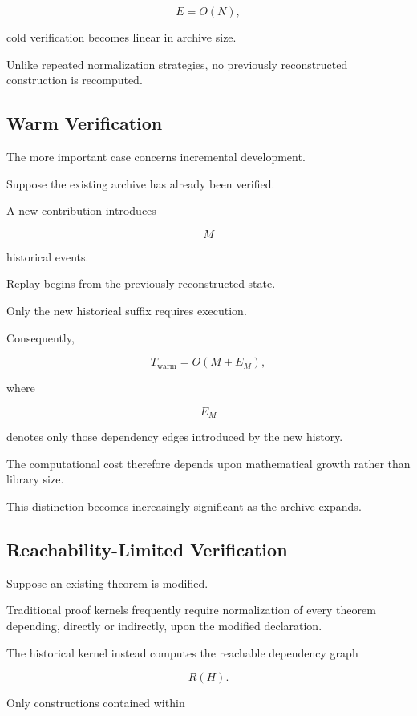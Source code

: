 \documentclass[12pt,oneside]{article}
\theoremstyle{definition}
\theoremstyle{remark}
\begin{document}
\[
E
=
O(N),
\]

cold verification becomes linear in archive size.

Unlike repeated normalization strategies, no previously reconstructed
construction is recomputed.


\subsection{Warm Verification}

The more important case concerns incremental development.

Suppose the existing archive has already been verified.

A new contribution introduces

\[
M
\]

historical events.

Replay begins from the previously reconstructed state.

Only the new historical suffix requires execution.

Consequently,

\[
T_{\mathrm{warm}}
=
O(M+E_M),
\]

where

\[
E_M
\]

denotes only those dependency edges introduced by the new history.

The computational cost therefore depends upon mathematical growth rather than
library size.

This distinction becomes increasingly significant as the archive expands.


\subsection{Reachability-Limited Verification}

Suppose an existing theorem is modified.

Traditional proof kernels frequently require normalization of every theorem
depending, directly or indirectly, upon the modified declaration.

The historical kernel instead computes the reachable dependency graph

\[
R(H).
\]

Only constructions contained within
\end{document}
